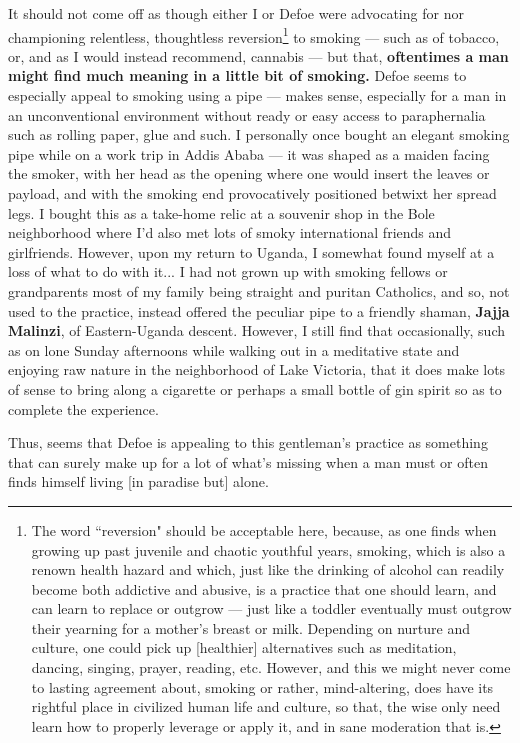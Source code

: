\documentclass[a4paper]{article}
\begin{document}
It should not come off as though either I or Defoe were advocating for nor championing relentless, thoughtless reversion\footnote{The word ``reversion" should be acceptable here, because, as one finds when growing up past juvenile and chaotic youthful years, smoking, which is also a renown health hazard and which, just like the drinking of alcohol can readily become both addictive and abusive, is a practice that one should learn, and can learn to replace or outgrow --- just like a toddler eventually must outgrow their yearning for a mother's breast or milk. Depending on nurture and culture, one could pick up [healthier] alternatives such as meditation, dancing, singing, prayer, reading, etc. However, and this we might never come to lasting agreement about, smoking or rather, mind-altering, does have its rightful place in civilized human life and culture, so that, the wise only need learn how to properly leverage or apply it, and in sane moderation that is.} to smoking --- such as of tobacco, or, and as I would instead recommend, cannabis --- but that, \textbf{oftentimes a man might find much meaning in a little bit of smoking.} Defoe seems to especially appeal to smoking using a pipe --- makes sense, especially for a man in an unconventional environment without ready or easy access to paraphernalia such as rolling paper, glue and such. I personally once bought an elegant smoking pipe while on a work trip in Addis Ababa --- it was shaped as a maiden facing the smoker, with her head as the opening where one would insert the leaves or payload, and with the smoking end provocatively positioned betwixt her spread legs. I bought this as a take-home relic at a souvenir shop in the Bole neighborhood where I'd also met lots of smoky international friends and girlfriends. However, upon my return to Uganda, I somewhat found myself at a loss of what to do with it... I had not grown up with smoking fellows or grandparents most of my family being straight and puritan Catholics, and so, not used to the practice, instead offered the peculiar pipe to a friendly shaman, \textbf{Jajja Malinzi}, of Eastern-Uganda descent. However, I still find that occasionally, such as on lone Sunday afternoons while walking out in a meditative state and enjoying raw nature in the neighborhood of Lake Victoria, that it does make lots of sense to bring along a cigarette or perhaps a small bottle of gin spirit so as to complete the experience.

Thus, seems that Defoe is appealing to this gentleman's practice as something that can surely make up for a lot of what's missing when a man must or often finds himself living [in paradise but] alone.
\end{document}
